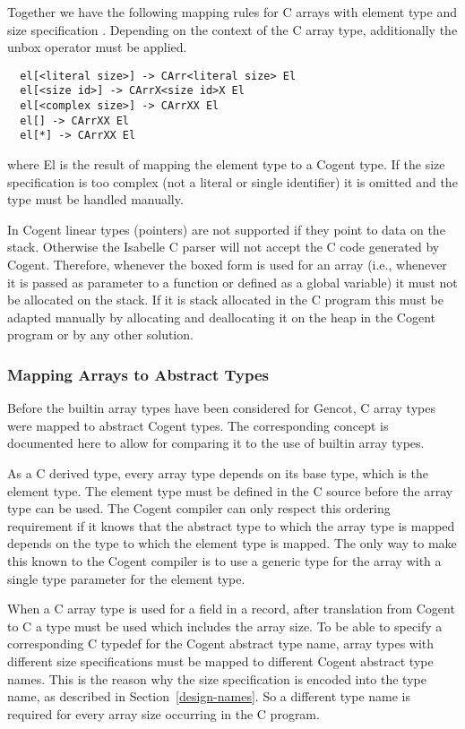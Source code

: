 Together we have the following mapping rules for C arrays with element type  and size 
specification . Depending on the context of the C array type, additionally the unbox operator must be applied.
\begin{verbatim}
  el[<literal size>] -> CArr<literal size> El
  el[<size id>] -> CArrX<size id>X El
  el[<complex size>] -> CArrXX El
  el[] -> CArrXX El
  el[*] -> CArrXX El
\end{verbatim}
where El is the result of mapping the element type  to a Cogent type. If the size specification
is too complex (not a literal or single identifier) it is omitted and the type must be handled manually.

In Cogent linear types (pointers) are not supported if they point to data on the stack. Otherwise the Isabelle 
C parser will not accept the C code generated by Cogent. Therefore, whenever the boxed form is used for an array
(i.e., whenever it is passed as parameter to a function or defined as a global variable) it must not be allocated
on the stack. If it is stack allocated in the C program this must be adapted manually by allocating and deallocating
it on the heap in the Cogent program or by any other solution.

\subsubsection{Mapping Arrays to Abstract Types}

Before the builtin array types have been considered for Gencot, C array types were mapped to abstract Cogent types.
The corresponding concept is documented here to allow for comparing it to the use of builtin array types.

As a C derived type, every array type depends on its base type, which is the element type. The element type must be defined in
the C source before the array type can be used. The Cogent compiler can only respect this ordering requirement if
it knows that the abstract type to which the array type is mapped depends on the type to which the element type
is mapped. The only way to make this known to the Cogent compiler is to use a generic type for the array with
a single type parameter for the element type. 

When a C array type is used for a field in a record, after translation from Cogent to C a type
must be used which includes the array size. To be able to specify a corresponding C typedef for the 
Cogent abstract type name, array types with different size specifications must be mapped to different 
Cogent abstract type names. This is the reason why the size specification is encoded into the type name,
as described in Section~\ref{design-names}. So a different type name is required for every array size 
occurring in the C program.

